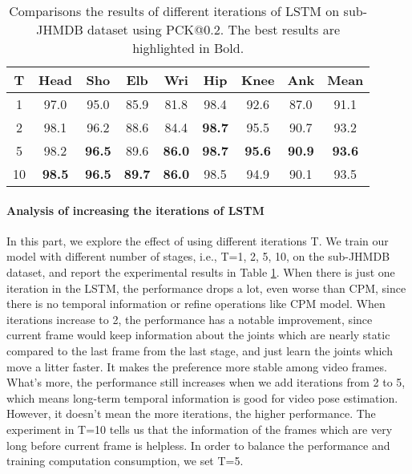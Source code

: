 \documentclass[10pt,twocolumn,letterpaper]{article}
\begin{document}
\renewcommand{\tabcolsep}{3pt}
\vspace{-3pt}
\begin{table}[!hbp]
  \footnotesize
  \centering
  \begin{tabular}{c | c c c c c c c | c}
  \toprule
   T & Head & Sho & Elb & Wri & Hip & Knee & Ank & Mean \\\hline
   1 & 97.0 & 95.0 & 85.9 & 81.8 & 98.4 & 92.6 & 87.0 & 91.1 \\
   2 & 98.1 & 96.2 & 88.6 & 84.4 & \textbf{98.7} & 95.5 & 90.7 & 93.2 \\
   5 & 98.2 & \textbf{96.5} & 89.6 & \textbf{86.0} & \textbf{98.7} & \textbf{95.6} & \textbf{90.9} & \textbf{93.6} \\
  10 & \textbf{98.5} & \textbf{96.5} & \textbf{89.7} & \textbf{86.0} & 98.5 & 94.9 & 90.1 & 93.5 \\
   \bottomrule
  \end{tabular}
  \vspace{2pt}
  \caption{Comparisons the results of different iterations of LSTM on sub-JHMDB dataset using PCK@0.2. The best results are highlighted in Bold.}
  \label{T-num}
  \vspace{-6pt}
\end{table}

\vspace{-4.5mm}
\paragraph{Analysis of increasing the iterations of LSTM} In this part, we explore the effect of using different iterations T. We train our model with different number of stages, i.e., T=1, 2, 5, 10, on the sub-JHMDB dataset, and report the experimental results in Table \ref{T-num}. When there is just one iteration in the LSTM, the performance drops a lot, even worse than CPM, since there is no temporal information or refine operations like CPM model. When iterations increase to 2, the performance has a notable improvement, since current frame would keep information about the joints which are nearly static compared to the last frame from the last stage, and just learn the joints which move a litter faster. It makes the preference more stable among video frames. What's more, the performance still increases when we add iterations from 2 to 5, which means long-term temporal information is good for video pose estimation. However, it doesn't mean the more iterations, the higher performance. The experiment in T=10 tells us that the information of the frames which are very long before current frame is helpless. In order to balance the performance and training computation consumption, we set T=5.
\end{document}
